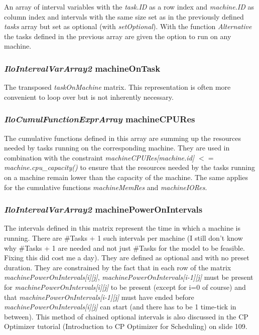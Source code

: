 An array of interval variables with the \textit{task.ID} as a row index and \textit{machine.ID} as column index and intervals with the same size set as in the previously defined \textit{tasks} array but set as optional (with \textit{setOptional}).
With the function \textit{Alternative} the tasks defined in the previous array are given the option to run on any machine. 

\subsubsection{\textit{IloIntervalVarArray2} machineOnTask}

The transposed \textit{taskOnMachine} matrix. This representation is often more convenient to loop over but is not inherently necessary. 

\subsubsection{\textit{IloCumulFunctionExprArray} machineCPURes}

The cumulative functions defined in this array are summing up the resources needed by tasks running on the corresponding machine. They are used in combination with the constraint \textit{machineCPURes[machine.id] $<=$ machine.cpu\_capacity()} to ensure that the resources needed by the tasks running on a machine remain lower than the capacity of the machine. The same applies for the cumulative functions \textit{machineMemRes} and \textit{machineIORes}.

\subsubsection{\textit{IloIntervalVarArray2} machinePowerOnIntervals}

The intervals defined in this matrix represent the time in which a machine is running. There are #Tasks + 1 such intervals per machine (I still don't know why #Tasks + 1 are needed and not just #Tasks for the model to be feasible. Fixing this did cost me a day). They are defined as optional and with no preset duration. They are constrained by the fact that in each row of the matrix \textit{machinePowerOnIntervals[i][j]}, \textit{machinePowerOnIntervals[i-1][j]} must be present for \textit{machinePowerOnIntervals[i][j]} to be present (except for i=0 of course) and that \textit{machinePowerOnIntervals[i-1][j]} must have ended before \textit{machinePowerOnIntervals[i][j]} can start (and there has to be 1 time-tick in between). This method of chained optional intervals is also discussed in the CP Optimizer tutorial (Introduction to CP Optimizer for Scheduling) on slide 109.

